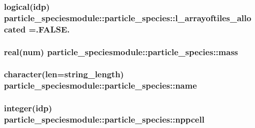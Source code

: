 \subsubsection[{\texorpdfstring{l\+\_\+arrayoftiles\+\_\+allocated}{l_arrayoftiles_allocated}}]{\setlength{\rightskip}{0pt plus 5cm}logical(idp) particle\+\_\+speciesmodule\+::particle\+\_\+species\+::l\+\_\+arrayoftiles\+\_\+allocated =.F\+A\+L\+S\+E.}\hypertarget{structparticle__speciesmodule_1_1particle__species_a7ba3dd839d9ff39e9c2a8b7151d93e3c}{}\label{structparticle__speciesmodule_1_1particle__species_a7ba3dd839d9ff39e9c2a8b7151d93e3c}
\subsubsection[{\texorpdfstring{mass}{mass}}]{\setlength{\rightskip}{0pt plus 5cm}real(num) particle\+\_\+speciesmodule\+::particle\+\_\+species\+::mass}\hypertarget{structparticle__speciesmodule_1_1particle__species_a06cae9ba8f87d3cfcfd1df4b7b2a31d6}{}\label{structparticle__speciesmodule_1_1particle__species_a06cae9ba8f87d3cfcfd1df4b7b2a31d6}
\subsubsection[{\texorpdfstring{name}{name}}]{\setlength{\rightskip}{0pt plus 5cm}character(len=string\+\_\+length) particle\+\_\+speciesmodule\+::particle\+\_\+species\+::name}\hypertarget{structparticle__speciesmodule_1_1particle__species_aa1e042e7e07eb5fbf85a87e3fde7e325}{}\label{structparticle__speciesmodule_1_1particle__species_aa1e042e7e07eb5fbf85a87e3fde7e325}
\subsubsection[{\texorpdfstring{nppcell}{nppcell}}]{\setlength{\rightskip}{0pt plus 5cm}integer(idp) particle\+\_\+speciesmodule\+::particle\+\_\+species\+::nppcell}\hypertarget{structparticle__speciesmodule_1_1particle__species_a85d9fbe02cbe094dd5d45b29e5a5cb52}{}\label{structparticle__speciesmodule_1_1particle__species_a85d9fbe02cbe094dd5d45b29e5a5cb52}
